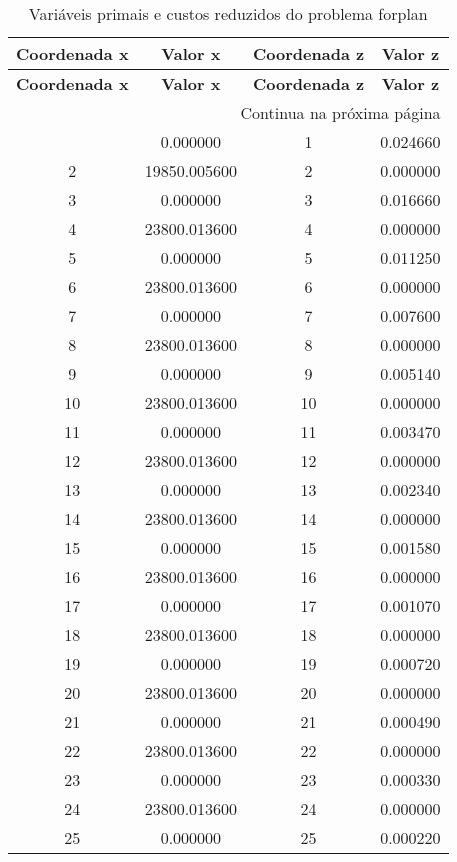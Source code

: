 \documentclass[12pt]{article}
\begin{document}
\begin{longtable}{@{}cccc@{}}
\caption{Variáveis primais e custos reduzidos do problema forplan} \\
\toprule
\textbf{Coordenada x} & \textbf{Valor x} & \textbf{Coordenada z} & \textbf{Valor z} \\
\midrule
\endfirsthead

\toprule
\textbf{Coordenada x} & \textbf{Valor x} & \textbf{Coordenada z} & \textbf{Valor z} \\
\midrule
\endhead

\midrule \multicolumn{4}{r}{{Continua na próxima página}} \\ \midrule
\endfoot

\bottomrule
\endlastfoot
1 & 0.000000 & 1 & 0.024660 \\
2 & 19850.005600 & 2 & 0.000000 \\
3 & 0.000000 & 3 & 0.016660 \\
4 & 23800.013600 & 4 & 0.000000 \\
5 & 0.000000 & 5 & 0.011250 \\
6 & 23800.013600 & 6 & 0.000000 \\
7 & 0.000000 & 7 & 0.007600 \\
8 & 23800.013600 & 8 & 0.000000 \\
9 & 0.000000 & 9 & 0.005140 \\
10 & 23800.013600 & 10 & 0.000000 \\
11 & 0.000000 & 11 & 0.003470 \\
12 & 23800.013600 & 12 & 0.000000 \\
13 & 0.000000 & 13 & 0.002340 \\
14 & 23800.013600 & 14 & 0.000000 \\
15 & 0.000000 & 15 & 0.001580 \\
16 & 23800.013600 & 16 & 0.000000 \\
17 & 0.000000 & 17 & 0.001070 \\
18 & 23800.013600 & 18 & 0.000000 \\
19 & 0.000000 & 19 & 0.000720 \\
20 & 23800.013600 & 20 & 0.000000 \\
21 & 0.000000 & 21 & 0.000490 \\
22 & 23800.013600 & 22 & 0.000000 \\
23 & 0.000000 & 23 & 0.000330 \\
24 & 23800.013600 & 24 & 0.000000 \\
25 & 0.000000 & 25 & 0.000220 \\

\end{longtable}
\end{document}
